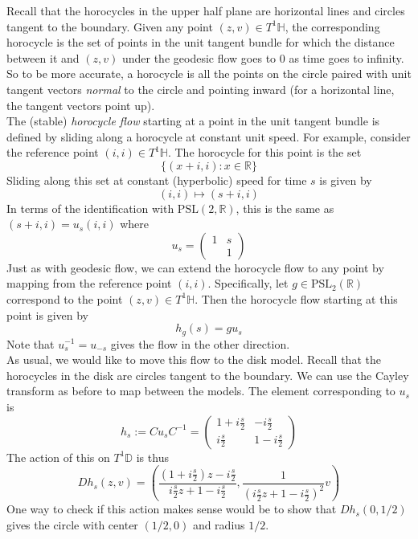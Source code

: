 \documentclass[]{article}
\begin{document}
Recall that the horocycles in the upper half plane are horizontal lines and circles tangent to the boundary.
Given any point $(z, v) \in T^1\mathbb{H}$, the corresponding horocycle is the set of points in the unit tangent bundle for which the distance between it and $(z, v)$ under the geodesic flow goes to $0$ as time goes to infinity.
So to be more accurate, a horocycle is all the points on the circle paired with unit tangent vectors \textit{normal} to the circle and pointing inward (for a horizontal line, the tangent vectors point up).
\\

The (stable) \textit{horocycle flow} starting at a point in the unit tangent bundle is defined by sliding along a horocycle at constant unit speed.
For example, consider the reference point $(i, i) \in T^1\mathbb{H}$.
The horocycle for this point is the set
$$
\{(x + i, i) : x \in \mathbb{R}\}
$$
Sliding along this set at constant (hyperbolic) speed for time $s$ is given by
$$
(i, i) \mapsto (s + i, i)
$$
In terms of the identification with $\text{PSL}(2, \mathbb{R})$, this is the same as $(s + i, i) = u_s(i, i)$ where
$$
u_s =
\begin{pmatrix}
1 & s \\
~ & 1
\end{pmatrix}
$$
Just as with geodesic flow, we can extend the horocycle flow to any point by mapping from the reference point $(i, i)$.
Specifically, let $g \in \text{PSL}_2(\mathbb{R})$ correspond to the point $(z, v) \in T^1\mathbb{H}$.
Then the horocycle flow starting at this point is given by
$$
h_g(s) = gu_s
$$
Note that $u_s^{-1} = u_{-s}$ gives the flow in the other direction.
\\

As usual, we would like to move this flow to the disk model.
Recall that the horocycles in the disk are circles tangent to the boundary.
We can use the Cayley transform as before to map between the models.
The element corresponding to $u_s$ is
$$
h_s := Cu_sC^{-1} =
\begin{pmatrix}
1 + i\frac{s}{2} & -i\frac{s}{2} \\
i\frac{s}{2} & 1 - i\frac{s}{2}
\end{pmatrix}
$$
The action of this on $T^1\mathbb{D}$ is thus
$$
Dh_s(z, v) = \left( \frac{\left( 1 + i\frac{s}{2} \right)z - i\frac{s}{2}}{i\frac{s}{2}z + 1 - i\frac{s}{2}}, \frac{1}{\left( i\frac{s}{2}z + 1 - i\frac{s}{2} \right)^2}v \right)
$$
One way to check if this action makes sense would be to show that $Dh_s(0, 1/2)$ gives the circle with center $(1/2, 0)$ and radius $1/2$.
\end{document}
